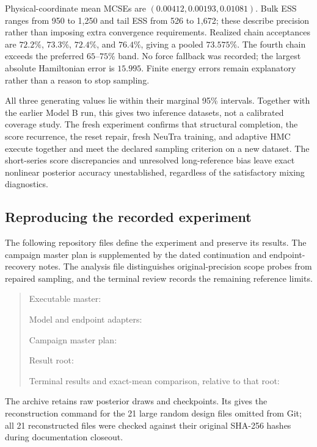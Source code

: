 Physical-coordinate mean MCSEs are $(0.00412,0.00193,0.01081)$.
Bulk ESS ranges from 950 to 1,250 and tail ESS from 526 to 1,672;
these describe precision rather than imposing extra convergence requirements.
Realized chain acceptances are $72.2\%$, $73.3\%$, $72.4\%$, and $76.4\%$, giving a pooled
$73.575\%$.  The fourth chain exceeds the preferred $65$--$75\%$ band.
No force fallback was recorded; the largest absolute Hamiltonian error is
$15.995$.  Finite energy errors remain explanatory rather than a reason to
stop sampling.

All three generating values lie within their marginal 95\% intervals.
Together with the earlier Model B run, this gives two inference datasets,
not a calibrated coverage study.  The fresh experiment confirms that
structural completion, the score recurrence, the reset repair, fresh NeuTra
training, and adaptive HMC execute together and meet the declared sampling
criterion on a new dataset.  The short-series score discrepancies and
unresolved long-reference bias leave exact nonlinear posterior accuracy
unestablished, regardless of the satisfactory mixing diagnostics.

\subsection{Reproducing the recorded experiment}

The following repository files define the experiment and preserve its results.
The campaign master plan is supplemented by the dated continuation and
endpoint-recovery notes.  The analysis file distinguishes original-precision
scope probes from repaired sampling, and the terminal review records the
remaining reference limits.
\begin{quote}\small\raggedright
Executable master:\par
{}\par
Model and endpoint adapters:\par
{}\par
{}\par
Campaign master plan:\par
{}\par
Result root:\par
{}\par
Terminal results and exact-mean comparison, relative to that root:\par
{}\par
{}\par
{}
\end{quote}
The archive retains raw posterior draws and checkpoints.  Its
 gives the reconstruction command for the 21 large random
design files omitted from Git; all 21 reconstructed files were checked against
their original SHA-256 hashes during documentation closeout.

